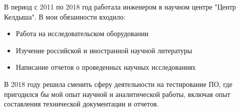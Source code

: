 \documentclass[10pt]{developercv} %
\begin{document}
\begin{minipage}[t]{1\textwidth}
	\vspace{-\baselineskip} %
	
	В период с 2011 по 2018 год работала инженером в научном центре "Центр Келдыша".
	В мои обязанности входило:
	\begin{itemize}
		\setlength\itemsep{0pt}
		\setlength\itemindent{-\baselineskip}
		\item{Работа на исследовательском оборудовании}
		\item{Изучение российской и иностранной научной литературы}
		\item{Написание отчетов о проведенных научных исследованиях}
	\end{itemize}
	В 2018 году решила сменить сферу деятельности на тестирование ПО, где
	пригодился бы мой опыт научной и аналитической работы, включая опыт
	составления технической документации и отчетов.

\end{minipage}
\hfill

\end{document}
